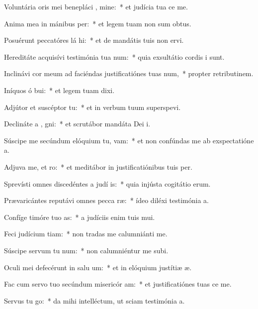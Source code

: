 \item Voluntária oris mei benepláci , mine:~* et judícia tua ce me.
\item Anima mea in mánibus  per:~* et legem tuam non sum obtus.
\item Posuérunt peccatóres lá hi:~* et de mandátis tuis non ervi.
\item Hereditáte acquisívi testimónia tua  num:~* quia exsultátio cordis i sunt.
\item Inclinávi cor meum ad faciéndas justificatiónes tuas  num,~* propter retributinem.
\item Iníquos ó bui:~* et legem tuam dixi.
\item Adjútor et suscéptor   tu:~* et in verbum tuum superspevi.
\item Declináte a , gni:~* et scrutábor mandáta Dei i.
\item Súscipe me secúndum elóquium tu,  vam:~* et non confúndas me ab exspectatióne a.
\item Adjuva me, et  ro:~* et meditábor in justificatiónibus tuis per.
\item Sprevísti omnes discedéntes a judí is:~* quia injústa cogitátio erum.
\item Prævaricántes reputávi omnes pecca ræ:~* ídeo diléxi testimónia a.
\item Confíge timóre tuo  as:~* a judíciis enim tuis mui.
\item Feci judícium  tiam:~* non tradas me calumniánti me.
\item Súscipe servum tu  num:~* non calumniéntur me subi.
\item Oculi mei defecérunt in salu um:~* et in elóquium justítiæ æ.
\item Fac cum servo tuo secúndum misericór am:~* et justificatiónes tuas ce me.
\item Servus tu  go:~* da mihi intelléctum, ut sciam testimónia a.
